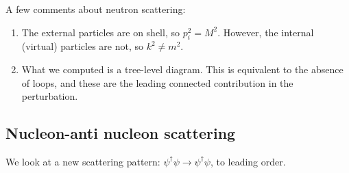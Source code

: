 \documentclass[12pt]{article}
\begin{document}
A few comments about neutron scattering:
\begin{enumerate}
	\item The external particles are on shell, so $p_i^2 = M^2$. However, the internal (virtual) particles are not, so $k^2 \neq m^2$.
	\item What we computed is a tree-level diagram. This is equivalent to the absence of loops, and these are the leading connected contribution in the perturbation.
\end{enumerate}

\subsection{Nucleon-anti nucleon scattering}%
\label{sub:nans}

We look at a new scattering pattern: $\psi^{\dagger} \psi \to \psi^{\dagger} \psi$, to leading order.
\end{document}
